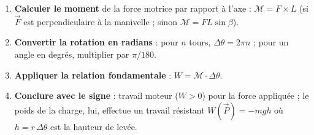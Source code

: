 \documentclass[11pt]{article}
\begin{document}
\begin{methode}
\begin{enumerate}
\item \textbf{Calculer le moment} de la force motrice par rapport à l'axe : $\mathcal{M} = F \times L$ (si $\vec{F}$ est perpendiculaire à la manivelle ; sinon $\mathcal{M} = F L \sin\beta$).
\item \textbf{Convertir la rotation en radians} : pour $n$ tours, $\Delta\theta = 2\pi n$ ; pour un angle en degrés, multiplier par $\pi/180$.
\item \textbf{Appliquer la relation fondamentale} : $W = \mathcal{M} \cdot \Delta\theta$.
\item \textbf{Conclure avec le signe} : travail moteur ($W>0$) pour la force appliquée ; le poids de la charge, lui, effectue un travail résistant $W(\vec{P}) = -mgh$ où $h = r\,\Delta\theta$ est la hauteur de levée.
\end{enumerate}
\end{methode}
\end{document}
